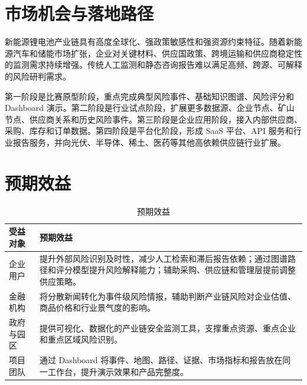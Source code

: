 \documentclass[12pt,a4paper]{ctexart}
\begin{document}
\section{市场机会与落地路径}

新能源锂电池产业链具有高度全球化、强政策敏感性和强资源约束特征。随着新能源汽车和储能市场扩张，企业对关键材料、供应国政策、跨境运输和供应商稳定性的监测需求持续增强。传统人工监测和静态咨询报告难以满足高频、跨源、可解释的风险研判需求。

\begin{center}
\end{center}

第一阶段是比赛原型阶段，重点完成典型风险事件、基础知识图谱、风险评分和 Dashboard 演示。第二阶段是行业试点阶段，扩展更多数据源、企业节点、矿山节点、供应商关系和历史风险事件。第三阶段是企业应用阶段，接入内部供应商、采购、库存和订单数据。第四阶段是平台化阶段，形成 SaaS 平台、API 服务和行业报告服务，并向光伏、半导体、稀土、医药等其他高依赖供应链行业扩展。

\section{预期效益}

\begin{table}[htbp]
\centering
\caption{预期效益}
\begin{tabularx}{\textwidth}{p{3.0cm}X}
\toprule
受益对象 & 预期效益 \\
\midrule
企业用户 & 提升外部风险识别及时性，减少人工检索和滞后报告依赖；通过图谱路径和评分模型提升风险解释能力；辅助采购、供应链和管理层提前调整供应策略。 \\
金融机构 & 将分散新闻转化为事件级风险情报，辅助判断产业链风险对企业估值、商品价格和行业景气度的影响。 \\
政府与园区 & 提供可视化、数据化的产业链安全监测工具，支撑重点资源、重点企业和重点区域风险识别。 \\
项目团队 & 通过 Dashboard 将事件、地图、路径、证据、市场指标和报告放在同一工作台，提升演示效果和产品完整度。 \\
\bottomrule
\end{tabularx}
\end{table}
\end{document}
